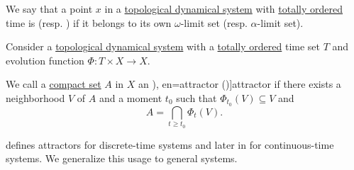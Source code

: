 \begin{definition}\label{def:dynamical_system_recurrent_point}
  We say that a point \( x \) in a \hyperref[def:topological_dynamical_system]{topological dynamical system} with \hyperref[def:totally_ordered_set]{totally ordered} time is  (resp. ) if it belongs to its own \( \omega \)-limit set (resp. \( \alpha \)-limit set).
\end{definition}

\begin{definition}\label{def:dynamical_system_attractor}\mimprovised
  Consider a \hyperref[def:topological_dynamical_system]{topological dynamical system} with a \hyperref[def:totally_ordered_set]{totally ordered} time set \( T \) and evolution function \( \Phi: T \times X \to X \).

  We call a \hyperref[def:compact_space]{compact set} \( A \) in \( X \) an \term[ru=аттрактор (\cite[94]{Юмагулов2015ДинамическиеСистемы}), en=attractor (\cite[def. 3.1.1]{HasselblattKatok1995DynamicalSystems})]{attractor} if there exists a neighborhood \( V \) of \( A \) and a moment \( t_0 \) such that \( \Phi_{t_0}(V) \subseteq V \) and
  \begin{equation}\label{eq:def:dynamical_system_attractor}
    A = \bigcap_{t \geq t_0} \Phi_t(V).
  \end{equation}
\end{definition}
\begin{comments}
  \item {} defines attractors for discrete-time systems and later in \cite[169]{Юмагулов2015ДинамическиеСистемы} for continuous-time systems. We generalize this usage to general systems.
\end{comments}
